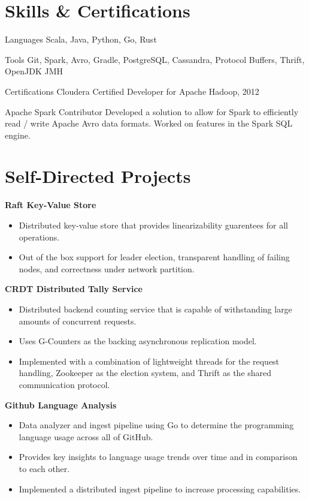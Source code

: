 \documentclass[a4paper,margin,line]{resume}
\begin{document}
\begin{resume}
\section{\mysidestyle Skills \& Certifications}
  \begin{compactdesc}
  \item[Languages] \small Scala, Java, Python, Go, Rust
  \item[Tools] \small Git, Spark, Avro, Gradle, PostgreSQL, Cassandra, Protocol Buffers, Thrift,
    OpenJDK JMH
  \item[Certifications] \small Cloudera Certified Developer for Apache Hadoop, 2012    
  \item[Apache Spark Contributor] Developed a solution to allow for Spark to efficiently read /
    write Apache Avro data formats. Worked on features in the Spark SQL engine.
  \end{compactdesc}
\section{\mysidestyle Self-Directed Projects}
  \textbf{Raft Key-Value Store}
  \begin{itemize}[noitemsep,nolistsep]
    \item Distributed key-value store that provides linearizability guarentees for all operations.
    \item Out of the box support for leader election, transparent handling of failing nodes, and
      correctness under network partition.
  \end{itemize}
  \textbf{CRDT Distributed Tally Service}
  \begin{itemize}[noitemsep,nolistsep]
    \item Distributed backend counting service that is capable of withstanding large amounts of
      concurrent requests.
    \item Uses G-Counters as the backing asynchronous replication model.
    \item Implemented with a combination of lightweight threads for the request handling, Zookeeper
      as the election system, and Thrift as the shared communication protocol.
   \end{itemize}
   \textbf{Github Language Analysis}
   \begin{itemize}[noitemsep,nolistsep]
     \item Data analyzer and ingest pipeline using Go to determine the programming language usage
       across all of GitHub.
     \item Provides key insights to language usage trends over time and in comparison to each other.
     \item Implemented a distributed ingest pipeline to increase processing capabilities.
   \end{itemize}
\end{resume}
\end{document}
